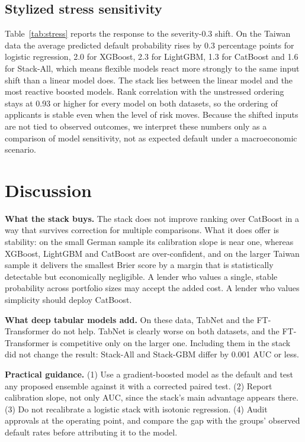 

\subsection{Stylized stress sensitivity}
Table~\ref{tab:stress} reports the response to the severity-0.3 shift. On the Taiwan data the average predicted default probability rises by 0.3 percentage points for logistic regression, 2.0 for XGBoost, 2.3 for LightGBM, 1.3 for CatBoost and 1.6 for Stack-All, which means flexible models react more strongly to the same input shift than a linear model does. The stack lies between the linear model and the most reactive boosted models. Rank correlation with the unstressed ordering stays at 0.93 or higher for every model on both datasets, so the ordering of applicants is stable even when the level of risk moves. Because the shifted inputs are not tied to observed outcomes, we interpret these numbers only as a comparison of model sensitivity, not as expected default under a macroeconomic scenario.



\section{Discussion}
\textbf{What the stack buys.} The stack does not improve ranking over CatBoost in a way that survives correction for multiple comparisons. What it does offer is stability: on the small German sample its calibration slope is near one, whereas XGBoost, LightGBM and CatBoost are over-confident, and on the larger Taiwan sample it delivers the smallest Brier score by a margin that is statistically detectable but economically negligible. A lender who values a single, stable probability across portfolio sizes may accept the added cost. A lender who values simplicity should deploy CatBoost.

\textbf{What deep tabular models add.} On these data, TabNet and the FT-Transformer do not help. TabNet is clearly worse on both datasets, and the FT-Transformer is competitive only on the larger one. Including them in the stack did not change the result: Stack-All and Stack-GBM differ by 0.001 AUC or less.

\textbf{Practical guidance.} (1) Use a gradient-boosted model as the default and test any proposed ensemble against it with a corrected paired test. (2) Report calibration slope, not only AUC, since the stack's main advantage appears there. (3) Do not recalibrate a logistic stack with isotonic regression. (4) Audit approvals at the operating point, and compare the gap with the groups' observed default rates before attributing it to the model.

